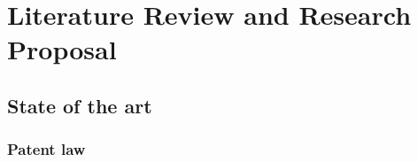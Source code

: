 \chapter{Literature Review and Research Proposal}
\label{chap:literature-review-and-research-proposal}

\lipsum[1]

\section{State of the art}

\subsection{Patent law}
